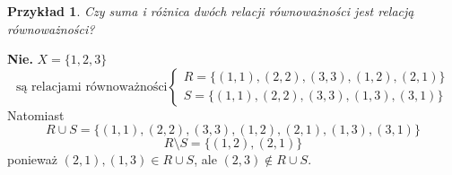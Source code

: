 \documentclass[a5paper,8pt]{article}
\theoremstyle{mythmstyle}
\newtheorem*{example}{Przykład}
\begin{document}
            \begin{example}
                Czy suma i różnica dwóch relacji równoważności jest relacją równoważności?
            \end{example}

            \textbf{Nie.} $ X = \{ 1, 2, 3 \} $\\
            \begin{equation*}
                \text{są relacjami równoważności}\begin{cases}
                    R = \{ (1, 1), (2, 2), (3, 3), (1, 2), (2, 1) \}\\
                    S = \{ (1, 1), (2, 2), (3, 3), (1, 3), (3, 1) \}
                \end{cases}
            \end{equation*}
            Natomiast
            \begin{equation*}
                R \cup S = \{ (1, 1), (2, 2), (3, 3), (1, 2), (2, 1), (1, 3), (3, 1) \}
            \end{equation*}
            \begin{equation*}
                R \setminus S = \{ (1, 2), (2, 1) \}
            \end{equation*}
            ponieważ $ (2, 1), (1, 3) \in R \cup S $, ale $ (2, 3) \notin R \cup S $.
\end{document}
